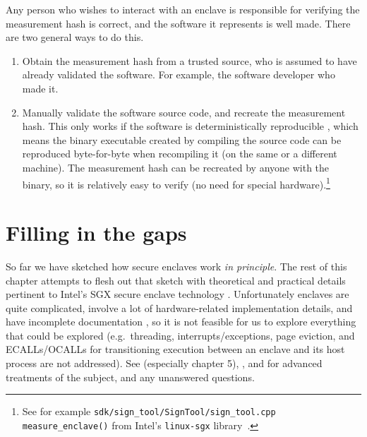 Any person who wishes to interact with an enclave is responsible for verifying the measurement hash is correct, and the software it represents is well made. There are two general ways to do this.
\begin{enumerate}
    \item Obtain the measurement hash from a trusted source, who is assumed to have already validated the software. For example, the software developer who made it.
    \item Manually validate the software source code, and recreate the measurement hash. This only works if the software is deterministically reproducible \cite{reproducible-builds-debian-wiki}, which means the binary executable created by compiling the source code can be reproduced byte-for-byte when recompiling it (on the same or a different machine). The measurement hash can be recreated by anyone with the binary, so it is relatively easy to verify (no need for special hardware).\footnote{\label{footnote:sgx-recreate-mrenclave}See for example {\tt sdk/sign\_tool/SignTool/sign\_tool.cpp measure\_enclave()} from Intel's {\tt linux-sgx} library~\cite{intel-lib-linux-sgx}.}%
\end{enumerate}



\section{Filling in the gaps}
\label{sec:enclaves-fill-gaps-detailed}

So far we have sketched how secure enclaves work {\em in principle}. The rest of this chapter attempts to flesh out that sketch with theoretical and practical details pertinent to Intel's SGX secure enclave technology \cite{intel-sgx-product-page, sgx-manual}. Unfortunately enclaves are quite complicated, involve a lot of hardware-related implementation details, and have incomplete documentation \cite{kudelski-sgx-secure-enclaves-review}, so it is not feasible for us to explore everything that could be explored (e.g.\ threading, interrupts/exceptions, page eviction, and ECALLs/OCALLs for transitioning execution between an enclave and its host process are not addressed). See \cite{intel-sgx-explained-advanced} (especially chapter 5), \cite{sgx-101-sslab}, and \cite{sgx-manual} for advanced treatments of the subject, and any unanswered questions.\\

